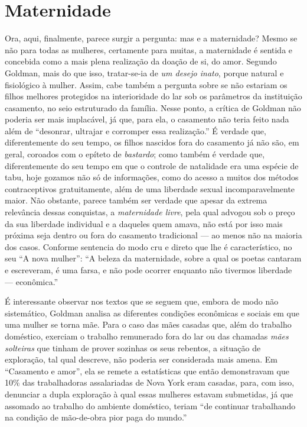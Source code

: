\section{Maternidade}

Ora, aqui, finalmente, parece surgir a pergunta: mas e a maternidade?
Mesmo se não para todas as mulheres, certamente para muitas, a
maternidade é sentida e concebida como a mais plena realização da doação
de si, do amor. Segundo Goldman, mais do que isso, tratar-se-ia de \textit{um
desejo inato}, porque natural e fisiológico à mulher. Assim, cabe
também a pergunta sobre se não estariam os filhos melhores protegidos na
interioridade do lar sob os parâmetros da instituição casamento, no seio
estruturado da família. Nesse ponto, a crítica de Goldman não poderia
ser mais implacável, já que, para ela, o casamento não teria feito nada
além de ``desonrar, ultrajar e corromper essa realização.'' É verdade
que, diferentemente do seu tempo, os filhos nascidos fora do casamento
já não são, em geral, coroados com o epíteto de \textit{bastardo}; como
também é verdade que, diferentemente do seu tempo em que o controle de
natalidade era uma espécie de tabu, hoje gozamos não só de informações,
como do acesso a muitos dos métodos contraceptivos gratuitamente, além
de uma liberdade sexual incomparavelmente maior. Não obstante, parece
também ser verdade que apesar da extrema relevância dessas conquistas, a
\textit{maternidade livre}, pela qual advogou sob o preço da sua liberdade
individual e a daqueles quem amava, não está por isso mais próxima seja
dentro ou fora do casamento tradicional --- ao menos não na maioria dos
casos. Conforme sentencia do modo cru e direto que lhe é característico,
no seu ``A nova mulher'': ``A beleza da maternidade, sobre a qual os
poetas cantaram e escreveram, é uma farsa, e não pode ocorrer enquanto
não tivermos liberdade --- econômica.''

É interessante observar nos textos que se seguem que, embora de modo não
sistemático, Goldman analisa as diferentes condições econômicas e
sociais em que uma mulher se torna mãe. Para o caso das mães casadas
que, além do trabalho doméstico, exerciam o trabalho remunerado fora do
lar ou das chamadas \textit{mães solteiras} que tinham de prover sozinhas os
seus rebentos, a situação de exploração, tal qual descreve, não poderia
ser considerada mais amena. Em ``Casamento e amor'', ela se remete a
estatísticas que então demonstravam que 10\% das trabalhadoras
assalariadas de Nova York eram casadas, para, com isso, denunciar a
dupla exploração à qual essas mulheres estavam submetidas, já que
assomado ao trabalho do ambiente doméstico, teriam ``de continuar
trabalhando na condição de mão-de-obra pior paga do mundo.''

